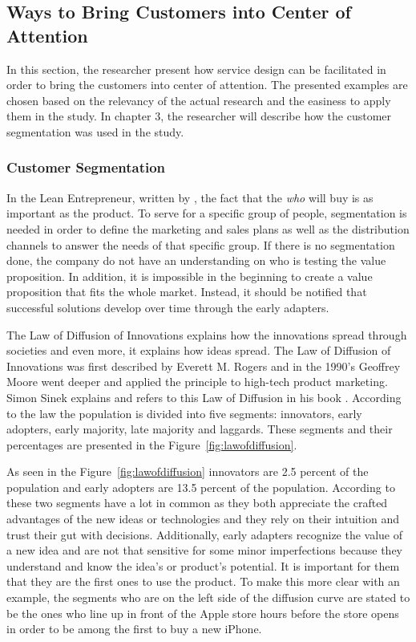 \subsection{Ways to Bring Customers into Center of Attention}

In this section, the researcher present how service design can be facilitated in order to bring the customers into center of attention. The presented examples are chosen based on the relevancy of the actual research and the easiness to apply them in the study. In chapter 3, the researcher will describe how the customer segmentation was used in the study.

\subsubsection*{Customer Segmentation}

In the Lean Entrepreneur, written by \textcite{LeanEntrepreneur:2013}, the fact that the \emph{who} will buy is as important as the product. To serve for a specific group of people, segmentation is needed in order to define the marketing and sales plans as well as the distribution channels to answer the needs of that specific group. If there is no segmentation done, the company do not have an understanding on who is testing the value proposition. In addition, it is impossible in the beginning to create a value proposition that fits the whole market. Instead, it should be notified that successful solutions develop over time through the early adapters.

The Law of Diffusion of Innovations explains how the innovations spread through societies and even more, it explains how ideas spread. The Law of Diffusion of Innovations was first described by Everett M. Rogers and in the 1990's Geoffrey Moore went deeper and applied the principle to high-tech product marketing. Simon Sinek explains and refers to this Law of Diffusion in his book . According to the law the population is divided into five segments: innovators, early adopters, early majority, late majority and laggards. These segments and their percentages are presented in the Figure~\ref{fig:lawofdiffusion}.

As seen in the Figure~\ref{fig:lawofdiffusion} innovators are 2.5 percent of the population and early adopters are 13.5 percent of the population. According to \textcite{Sinek:2009} these two segments have a lot in common as they both appreciate the crafted advantages of the new ideas or technologies and they rely on their intuition and trust their gut with decisions. Additionally, early adapters recognize the value of a new idea and are not that sensitive for some minor imperfections because they understand and know the idea's or product's potential. It is important for them that they are the first ones to use the product. To make this more clear with an example, the segments who are on the left side of the diffusion curve are stated to be the ones who line up in front of the Apple store hours before the store opens in order to be among the first to buy a new iPhone.

